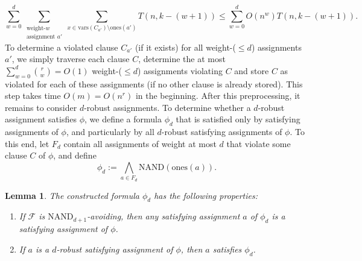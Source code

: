 \documentclass[10pt,a4paper]{article}
\theoremstyle{plain}
\newtheorem{lem}[thm]{Lemma}
\newcommand{\NAND}{\mathrm{NAND}}
\newcommand{\confam}{\mathcal{F}}
\newcommand{\vars}{\mathrm{vars}}
\newcommand{\ones}{\mathrm{ones}}
\begin{document}
\begin{equation}\label{eq:rec1}
\sum_{w=0}^d \sum_{\substack{\text{weight-}w\\ \text{assignment }a'}} \sum_{x\in \vars(C_{a'})\setminus \ones(a')} T(n, k-(w+1)) \le \sum_{w=0}^d O(n^w) T(n, k-(w+1)). 
\end{equation}
To determine a violated clause $C_{a'}$ (if it exists) for all weight-($\le d$) assignments $a'$, we simply traverse each clause $C$, determine the at most $\sum_{w=0}^d {r \choose w}= O(1)$ weight-($\le d$) assignments violating $C$ and store $C$ as violated for each of these assignments (if no other clause is already stored). This step takes time $O(m) = O(n^r)$ in the beginning. 
%
%
After this preprocessing, it remains to consider $d$-robust assignments. To determine whether a $d$-robust assignment satisfies $\phi$, we define a formula $\phi_d$ that is satisfied only by satisfying assignments of $\phi$, and particularly by all $d$-robust satisfying assignments of $\phi$. To this end, let $F_d$ contain all assignments of weight at most $d$ that violate some clause $C$ of $\phi$, and define
\[ \phi_d := \bigwedge_{a \in F_d} \NAND(\ones(a)). \]
  \begin{lem}\label{lem:NANDrep}
  The constructed formula $\phi_d$ has the following properties:
\begin{enumerate}[label=(P\arabic*)]
  \item If $\confam$ is $\NAND_{d+1}$-avoiding, then any satisfying assignment $a$ of $\phi_d$ is a satisfying assignment of $\phi$.
  \item If $a$ is a $d$-robust satisfying assignment of $\phi$, then $a$ satisfies $\phi_d$.
    \end{enumerate}
  \end{lem}
\end{document}
